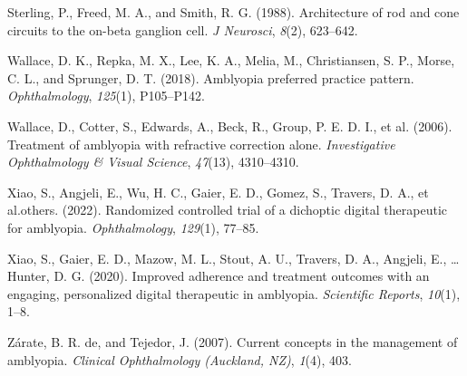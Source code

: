 \documentclass[
  onecolumn]{article}
\newlength{\cslhangindent}
\newenvironment{CSLReferences}[2] %
 {%
  \setlength{\parindent}{0pt}
  \ifodd #1 \everypar{\setlength{\hangindent}{\cslhangindent}}\ignorespaces\fi
  \ifnum #2 > 0
  \setlength{\parskip}{#2\baselineskip}
  \fi
 }%
 {}
\begin{document}
\begin{CSLReferences}{1}{0}
\leavevmode{}%
Sterling, P., Freed, M. A., and Smith, R. G. (1988). {Architecture of
rod and cone circuits to the on-beta ganglion cell}. \emph{J Neurosci},
\emph{8}(2), 623--642.

\leavevmode{}%
Wallace, D. K., Repka, M. X., Lee, K. A., Melia, M., Christiansen, S.
P., Morse, C. L., and Sprunger, D. T. (2018). Amblyopia preferred
practice pattern{\textregistered}. \emph{Ophthalmology}, \emph{125}(1),
P105--P142.

\leavevmode{}%
Wallace, D., Cotter, S., Edwards, A., Beck, R., Group, P. E. D. I., et
al. (2006). Treatment of amblyopia with refractive correction alone.
\emph{Investigative Ophthalmology \& Visual Science}, \emph{47}(13),
4310--4310.

\leavevmode{}%
Xiao, S., Angjeli, E., Wu, H. C., Gaier, E. D., Gomez, S., Travers, D.
A., et al.others. (2022). Randomized controlled trial of a dichoptic
digital therapeutic for amblyopia. \emph{Ophthalmology}, \emph{129}(1),
77--85.

\leavevmode{}%
Xiao, S., Gaier, E. D., Mazow, M. L., Stout, A. U., Travers, D. A.,
Angjeli, E., \ldots{} Hunter, D. G. (2020). Improved adherence and
treatment outcomes with an engaging, personalized digital therapeutic in
amblyopia. \emph{Scientific Reports}, \emph{10}(1), 1--8.

\leavevmode{}%
Zárate, B. R. de, and Tejedor, J. (2007). Current concepts in the
management of amblyopia. \emph{Clinical Ophthalmology (Auckland, NZ)},
\emph{1}(4), 403.

\end{CSLReferences}
\end{document}
